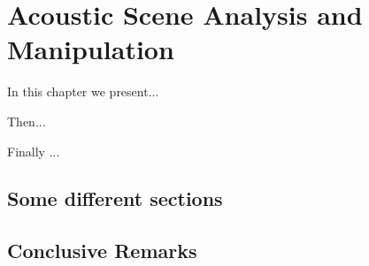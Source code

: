 \chapter{Acoustic Scene Analysis and Manipulation}
\label{chap:Processing}
\thispagestyle{empty}
\vspace{0.5cm}

\noindent In this chapter we present...

Then...

Finally ...


\section{Some different sections}

\section{Conclusive Remarks}
